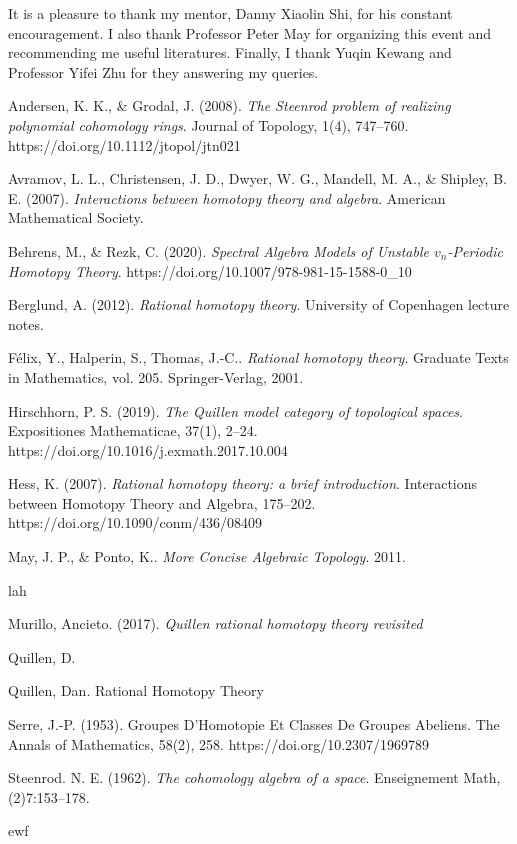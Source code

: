 \documentclass[psamsfonts]{amsart}
\theoremstyle{definition}
\numberwithin{equation}{section}
\begin{document}
It is a pleasure to thank my mentor, Danny Xiaolin Shi, for his constant encouragement. I also thank Professor Peter May for organizing this event and recommending me useful literatures. Finally, I thank Yuqin Kewang and Professor Yifei Zhu for they answering my queries.

\newpage
\begin{thebibliography}{9}

Andersen, K. K., \& Grodal, J. (2008). \textit{The Steenrod problem of realizing polynomial cohomology rings}. Journal of Topology, 1(4), 747–760. https://doi.org/10.1112/jtopol/jtn021 

Avramov, L. L., Christensen, J. D., Dwyer, W. G., Mandell, M. A., \& Shipley, B. E. (2007). \textit{Interactions between homotopy theory and algebra}. American Mathematical Society.

Behrens, M., \& Rezk, C. (2020). \textit{Spectral Algebra Models of Unstable $v_n$-Periodic Homotopy Theory}. https://doi.org/10.1007/978-981-15-1588-0\_10 

Berglund, A. (2012). \textit{Rational homotopy theory}. University of Copenhagen lecture notes.


Félix, Y., Halperin, S., Thomas, J.-C.. \textit{Rational homotopy theory}. Graduate Texts in Mathematics, vol. 205. Springer-Verlag, 2001.


Hirschhorn, P. S. (2019). \textit{The Quillen model category of topological spaces}. Expositiones Mathematicae, 37(1), 2–24. https://doi.org/10.1016/j.exmath.2017.10.004 

Hess, K. (2007). \textit{Rational homotopy theory: a brief introduction}. Interactions between Homotopy Theory and Algebra, 175–202. https://doi.org/10.1090/conm/436/08409

May, J. P., \& Ponto, K.. \textit{More Concise Algebraic Topology}. 2011.

 lah

 Murillo, Ancieto. (2017). \textit{Quillen rational homotopy theory revisited}

 Quillen, D.

 Quillen, Dan. Rational Homotopy Theory

Serre, J.-P. (1953). Groupes D'Homotopie Et Classes De Groupes Abeliens. The Annals of Mathematics, 58(2), 258. https://doi.org/10.2307/1969789 

Steenrod. N. E. (1962). \textit{The cohomology algebra of a space}. Enseignement Math, (2)7:153–178.

 ewf

\end{thebibliography}
\end{document}
